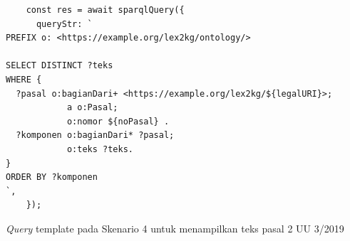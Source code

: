 \begin{listing}[H]
  \begin{verbatim}
    const res = await sparqlQuery({
      queryStr: `
PREFIX o: <https://example.org/lex2kg/ontology/>

SELECT DISTINCT ?teks
WHERE {
  ?pasal o:bagianDari+ <https://example.org/lex2kg/${legalURI}>;
            a o:Pasal;
            o:nomor ${noPasal} .
  ?komponen o:bagianDari* ?pasal;
            o:teks ?teks.
}
ORDER BY ?komponen
`,
    });
  \end{verbatim}
  \caption{\textit{Query} template pada Skenario 4 untuk menampilkan teks pasal 2 UU 3/2019}
  \label{lst:chatbot-4-2-query}
\end{listing}

